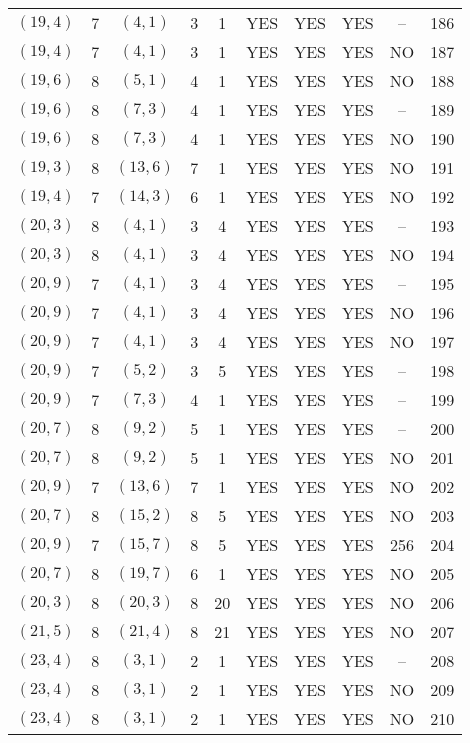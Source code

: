 \begin{longtable}{|c|c|c|c|c|c|c|c|c|c|}
$(19, 4)$ & 7 & $(4, 1)$ & 3 & 1 & YES & YES & YES & -- & 186\\
$(19, 4)$ & 7 & $(4, 1)$ & 3 & 1 & YES & YES & YES & NO & 187\\
$(19, 6)$ & 8 & $(5, 1)$ & 4 & 1 & YES & YES & YES & NO & 188\\
$(19, 6)$ & 8 & $(7, 3)$ & 4 & 1 & YES & YES & YES & -- & 189\\
$(19, 6)$ & 8 & $(7, 3)$ & 4 & 1 & YES & YES & YES & NO & 190\\
$(19, 3)$ & 8 & $(13, 6)$ & 7 & 1 & YES & YES & YES & NO & 191\\
$(19, 4)$ & 7 & $(14, 3)$ & 6 & 1 & YES & YES & YES & NO & 192\\
$(20, 3)$ & 8 & $(4, 1)$ & 3 & 4 & YES & YES & YES & -- & 193\\
$(20, 3)$ & 8 & $(4, 1)$ & 3 & 4 & YES & YES & YES & NO & 194\\
$(20, 9)$ & 7 & $(4, 1)$ & 3 & 4 & YES & YES & YES & -- & 195\\
$(20, 9)$ & 7 & $(4, 1)$ & 3 & 4 & YES & YES & YES & NO & 196\\
$(20, 9)$ & 7 & $(4, 1)$ & 3 & 4 & YES & YES & YES & NO & 197\\
$(20, 9)$ & 7 & $(5, 2)$ & 3 & 5 & YES & YES & YES & -- & 198\\
$(20, 9)$ & 7 & $(7, 3)$ & 4 & 1 & YES & YES & YES & -- & 199\\
$(20, 7)$ & 8 & $(9, 2)$ & 5 & 1 & YES & YES & YES & -- & 200\\
$(20, 7)$ & 8 & $(9, 2)$ & 5 & 1 & YES & YES & YES & NO & 201\\
$(20, 9)$ & 7 & $(13, 6)$ & 7 & 1 & YES & YES & YES & NO & 202\\
$(20, 7)$ & 8 & $(15, 2)$ & 8 & 5 & YES & YES & YES & NO & 203\\
$(20, 9)$ & 7 & $(15, 7)$ & 8 & 5 & YES & YES & YES & 256 & 204\\
$(20, 7)$ & 8 & $(19, 7)$ & 6 & 1 & YES & YES & YES & NO & 205\\
$(20, 3)$ & 8 & $(20, 3)$ & 8 & 20 & YES & YES & YES & NO & 206\\
$(21, 5)$ & 8 & $(21, 4)$ & 8 & 21 & YES & YES & YES & NO & 207\\
$(23, 4)$ & 8 & $(3, 1)$ & 2 & 1 & YES & YES & YES & -- & 208\\
$(23, 4)$ & 8 & $(3, 1)$ & 2 & 1 & YES & YES & YES & NO & 209\\
$(23, 4)$ & 8 & $(3, 1)$ & 2 & 1 & YES & YES & YES & NO & 210\\

\end{longtable}
